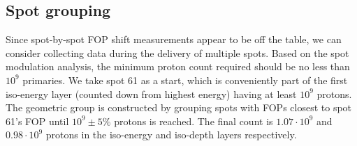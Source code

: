 \documentclass[a4paper,english]{article}
\begin{document}

\subsection{Spot grouping}


Since spot-by-spot FOP shift measurements appear to be off the table, we can consider collecting data during the delivery of multiple spots. Based on the spot modulation analysis, the minimum proton count required should be no less than $10^9$ primaries. We take spot 61 as a start, which is conveniently part of the first iso-energy layer (counted down from highest energy) having at least $10^9$ protons. The geometric group is constructed by grouping spots with FOPs closest to spot 61's FOP until $10^9\pm5\%$ protons is reached. The final count is $1.07\cdot10^9$ and $0.98\cdot10^9$ protons in the iso-energy and iso-depth layers respectively.
\end{document}
